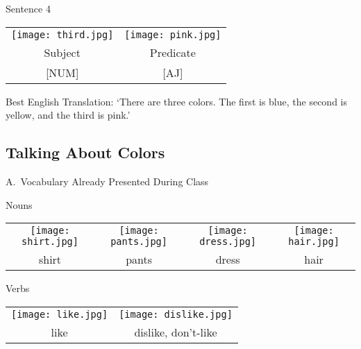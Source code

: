 \documentclass{tufte-book}
\begin{document}
\noindent Sentence 4

\begin{table*}[h!]
\begin{tabular}{c c}
\texttt{[image: third.jpg]}&\texttt{[image: pink.jpg]}\\
\footnotesize Subject & \footnotesize Predicate \\
\footnotesize [NUM] & \footnotesize [AJ]\\
\end{tabular}
\end{table*}

\begin{fullwidth}
Best English Translation: `There are three colors. The first is blue, the second is yellow, and the third is pink.'\end{fullwidth}
\newpage

\subsection{Talking About Colors}

\noindent A.~Vocabulary Already Presented During Class

\vspace{0.25cm} \noindent Nouns

\begin{table*}[h!]
\begin{tabular}{c c c c}
\texttt{[image: shirt.jpg]} & \texttt{[image: pants.jpg]}& \texttt{[image: dress.jpg]} &\texttt{[image: hair.jpg]}\\
\footnotesize shirt & \footnotesize pants & \footnotesize dress & \footnotesize hair\\


\end{tabular}
\end{table*}

\vspace{0.25cm}\noindent Verbs

\begin{table*}[h!]
\begin{tabular}{c c }
\texttt{[image: like.jpg]} & \texttt{[image: dislike.jpg]}\\
\footnotesize like& \footnotesize dislike, don't-like \\


\end{tabular}
\end{table*}
\end{document}
